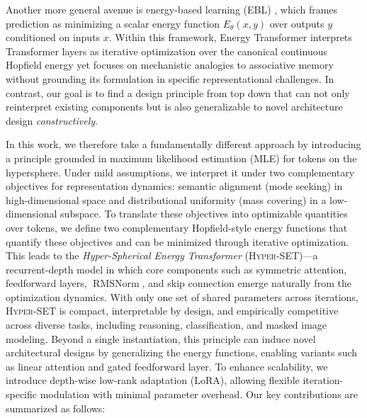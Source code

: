Another more general avenue is energy-based learning (EBL) \citep{dawid2024introduction}, which frames prediction as minimizing a scalar energy function $E_\theta(x, y)$ over outputs $y$ conditioned on inputs $x$. Within this framework, Energy Transformer \citep{hoover2024energy} interprets Transformer layers as iterative optimization over the canonical continuous Hopfield energy \citep{ramsauer2021hopfield,krotov2021large} yet focuses on mechanistic analogies to associative memory without grounding its formulation in specific representational challenges.
In contrast, our goal is to find a design principle from top down that can not only reinterpret existing components but is also generalizable to novel architecture design \emph{constructively}.

In this work, we therefore take a fundamentally different approach by introducing a principle grounded in maximum likelihood estimation (MLE) for tokens on the hypersphere. Under mild assumptions, we interpret it under two complementary objectives for representation dynamics: semantic alignment (mode seeking) in high-dimensional space and distributional uniformity (mass covering) in a low-dimensional subspace. To translate these objectives into optimizable quantities over tokens, we define two complementary Hopfield-style energy functions that quantify these objectives and can be minimized through iterative optimization. This leads to the \emph{Hyper-Spherical Energy Transformer} (\textsc{Hyper-SET})—a recurrent-depth model in which core components such as symmetric attention, feedforward layers, $\operatorname{RMSNorm}$, and skip connection emerge naturally from the optimization dynamics. With only one set of shared parameters across iterations, \textsc{Hyper-SET} is compact, interpretable by design, and empirically competitive across diverse tasks, including reasoning, classification, and masked image modeling. Beyond a single instantiation, this principle can induce novel architectural designs by generalizing the energy functions, enabling variants such as linear attention and gated feedforward layer. To enhance scalability, we introduce depth-wise low-rank adaptation (LoRA), allowing flexible iteration-specific modulation with minimal parameter overhead. Our key contributions are summarized as follows:
